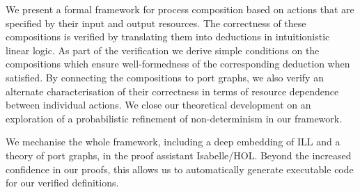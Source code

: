 We present a formal framework for process composition based on actions that are specified by their input and output resources.
The correctness of these compositions is verified by translating them into deductions in intuitionistic linear logic.
As part of the verification we derive simple conditions on the compositions which ensure well-formedness of the corresponding deduction when satisfied.
By connecting the compositions to port graphs, we also verify an alternate characterisation of their correctness in terms of resource dependence between individual actions.
We close our theoretical development on an exploration of a probabilistic refinement of non-determinism in our framework.

We mechanise the whole framework, including a deep embedding of ILL and a theory of port graphs, in the proof assistant Isabelle/HOL\@.
Beyond the increased confidence in our proofs, this allows us to automatically generate executable code for our verified definitions.
